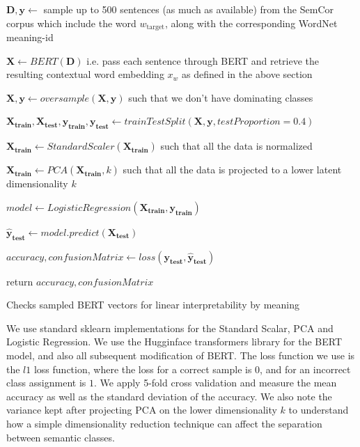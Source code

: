 \documentclass[a4paper,12pt,oneside,openright]{report}
\begin{document}
\begin{algorithm}[H]
\SetAlgoLined
{}
 $\mathbf{D}, \mathbf{y} \leftarrow $  sample up to 500 sentences (as much as available) from the SemCor corpus which include the word $w_{\text{target}}$, along with the corresponding WordNet meaning-id\;

$ \mathbf{X} \leftarrow BERT( \mathbf{D} )$ i.e. pass each sentence through BERT and retrieve the resulting contextual word embedding $x_w$ as defined in the above section\;
 
$ \mathbf{X}, \mathbf{y} \leftarrow oversample( \mathbf{X}, \mathbf{y} )$ such that we don't have dominating classes\;
 
$ \mathbf{X_\text{train}}, \mathbf{X_\text{test}}, \mathbf{y_\text{train}}, \mathbf{y_\text{test}} \leftarrow trainTestSplit( \mathbf{X}, \mathbf{y}, testProportion=0.4 )$ \;

$ \mathbf{X_\text{train}} \leftarrow StandardScaler( \mathbf{X_\text{train}})$ such that all the data is normalized\;

$ \mathbf{X_\text{train}} \leftarrow PCA( \mathbf{X_\text{train}}, k )$ such that all the data is projected to a lower latent dimensionality $k$\;

$ model \leftarrow LogisticRegression( \mathbf{X_\text{train}}, \mathbf{y_\text{train}} )$ \;
    
$ \mathbf{\hat{y}_\text{test}} \leftarrow model.predict(\mathbf{X_\text{test}})$ \;

$ accuracy, confusionMatrix \leftarrow loss(\mathbf{y_\text{test}}, \mathbf{\hat{y}_\text{test}}) $ \;
    
return $ accuracy, confusionMatrix $\;
    
 \caption{Checks sampled BERT vectors for linear interpretability by meaning}
\end{algorithm}

We use standard sklearn \cite{scikit-learn} implementations for the Standard Scalar, PCA and Logistic Regression. 
We use the Hugginface transformers library \cite{Wolf2019} for the  BERT model, and also all subsequent modification of BERT.
The loss function we use is the $l1$ loss function, where the loss for a correct sample is $0$, and for an incorrect class assignment is $1$.
We apply 5-fold cross validation and measure the mean accuracy as well as the standard deviation of the accuracy. 
We also note the variance kept after projecting PCA on the lower dimensionality $k$ to understand how a simple dimensionality reduction technique can affect the separation between semantic classes.
\end{document}
